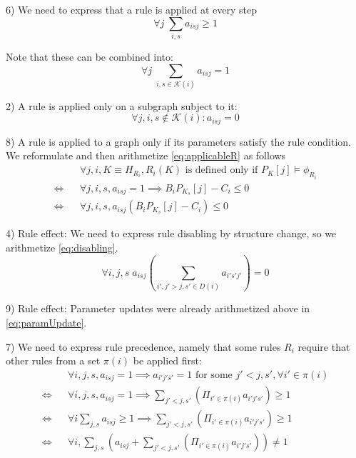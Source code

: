 \documentclass[11pt, oneside, reqno]{article}
\newcommand{\Kc}{\mathcal{K}}
\begin{document}
6) We need to express that a rule is applied at every step
\begin{equation}
\label{eq:oneruleeverystepArithm}
\forall j\; \sum_{i,s}a_{isj} \geq 1 
\end{equation}

Note that these can be combined into:
\begin{equation}
\label{eq:exactlyoneArithm}
\forall j\; \sum_{i,s \in \Kc(i)}a_{isj} = 1 
\end{equation}

2) A rule is applied only on a subgraph subject to it:
\begin{equation}
\label{eq:ruleongraphArithm}
\forall j,i,s \notin \Kc(i): a_{isj} = 0
\end{equation}

8) A rule is applied to a graph only if its parameters satisfy the rule condition. We reformulate and then arithmetize \eqref{eq:applicableR} as follows
\begin{eqnarray}
\label{eq:applicableRArithm}
&& \forall j,i,K \equiv H_{R_i}, R_i(K) \textrm{ is defined only if } P_K[j] \models \phi_{R_i}
\nonumber
\\
\Leftrightarrow && \forall j,i,s, a_{isj}=1 \implies B_iP_{K_s}[j]-C_i \leq 0 
\nonumber 
\\
\Leftrightarrow && \forall j,i,s, a_{isj} (B_iP_{K_s}[j]-C_i) \leq 0 
\end{eqnarray}

4) Rule effect: We need to express rule disabling by structure change, so we arithmetize \eqref{eq:disabling}.
\begin{equation}
\label{eq:disablingStructArithm}
\forall i,j,s \; a_{isj}\left(\sum_{i',j'>j,s' \in D(i)}a_{i's'j'}\right) =0
\end{equation}

9) Rule effect: Parameter updates were already arithmetized above in \eqref{eq:paramUpdate}. 

7) We need to express rule precedence, namely that some rules $R_i$ require that other rules from a set $\pi(i)$ be applied first:
\begin{eqnarray}
\label{eq:precedenceArithm}
&& \forall i,j,s, a_{isj}=1 \implies a_{i'j's'}=1 \textrm{ for some } j'<j,s',\forall i'\in \pi(i)
\nonumber
\\
\Leftrightarrow && \forall i,j,s, a_{isj}=1 \implies \sum_{j'<j,s'}\left(\Pi_{i'\in \pi(i)}a_{i'j's'}\right) \geq 1 
\nonumber
\\
\Leftrightarrow && \forall i \sum_{j,s}a_{isj} \geq 1 \implies \sum_{j'<j,s'}\left(\Pi_{i'\in \pi(i)}a_{i'j's'}\right) \geq 1 
\nonumber
\\
\Leftrightarrow && \forall i, \sum_{j,s}\left(a_{isj} + \sum_{j'<j,s'}\left(\Pi_{i'\in \pi(i)}a_{i'j's'}\right)\right) \neq 1 
\end{eqnarray}
\end{document}
